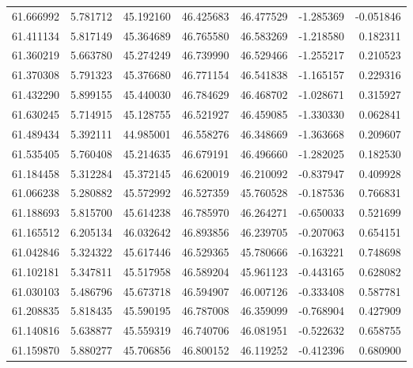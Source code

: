 \begin{tabular}{rrrrrrr}
 61.666992 &   5.781712 &         45.192160 &         46.425683 &         46.477529 & -1.285369 & -0.051846 \\
 61.411134 &   5.817149 &         45.364689 &         46.765580 &         46.583269 & -1.218580 &  0.182311 \\
 61.360219 &   5.663780 &         45.274249 &         46.739990 &         46.529466 & -1.255217 &  0.210523 \\
 61.370308 &   5.791323 &         45.376680 &         46.771154 &         46.541838 & -1.165157 &  0.229316 \\
 61.432290 &   5.899155 &         45.440030 &         46.784629 &         46.468702 & -1.028671 &  0.315927 \\
 61.630245 &   5.714915 &         45.128755 &         46.521927 &         46.459085 & -1.330330 &  0.062841 \\
 61.489434 &   5.392111 &         44.985001 &         46.558276 &         46.348669 & -1.363668 &  0.209607 \\
 61.535405 &   5.760408 &         45.214635 &         46.679191 &         46.496660 & -1.282025 &  0.182530 \\
 61.184458 &   5.312284 &         45.372145 &         46.620019 &         46.210092 & -0.837947 &  0.409928 \\
 61.066238 &   5.280882 &         45.572992 &         46.527359 &         45.760528 & -0.187536 &  0.766831 \\
 61.188693 &   5.815700 &         45.614238 &         46.785970 &         46.264271 & -0.650033 &  0.521699 \\
 61.165512 &   6.205134 &         46.032642 &         46.893856 &         46.239705 & -0.207063 &  0.654151 \\
 61.042846 &   5.324322 &         45.617446 &         46.529365 &         45.780666 & -0.163221 &  0.748698 \\
 61.102181 &   5.347811 &         45.517958 &         46.589204 &         45.961123 & -0.443165 &  0.628082 \\
 61.030103 &   5.486796 &         45.673718 &         46.594907 &         46.007126 & -0.333408 &  0.587781 \\
 61.208835 &   5.818435 &         45.590195 &         46.787008 &         46.359099 & -0.768904 &  0.427909 \\
 61.140816 &   5.638877 &         45.559319 &         46.740706 &         46.081951 & -0.522632 &  0.658755 \\
 61.159870 &   5.880277 &         45.706856 &         46.800152 &         46.119252 & -0.412396 &  0.680900 \\

\end{tabular}
